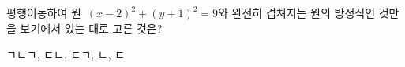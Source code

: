 평행이동하여 원~$(x-2)^2+(y+1)^2=9$와 완전히 겹쳐지는 원의 방정식인 것만을 보기에서 있는 대로 고른 것은?
\begin{choices32}{ㄱ}{ㄴ}{ㄱ, ㄷ}{ㄴ, ㄷ}{ㄱ, ㄴ, ㄷ}\end{choices32}
